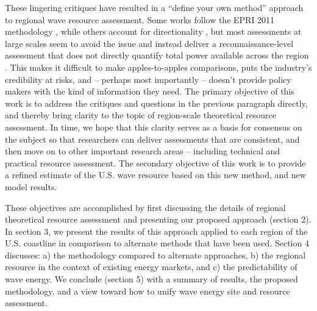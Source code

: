 These lingering critiques have resulted in a ``define your own method'' approach to regional wave resource assessment. Some works follow the EPRI 2011 methodology \citep[e.g., ]{kumarWaveEnergyResource2015}, while others account for directionality \citep[e.g., ]{gunnQuantifyingGlobalWave2012, regueroGlobalWavePower2015, hemerRevisedAssessmentAustralia2017}, but most assessments at large scales seem to avoid the issue and instead deliver a reconnaissance-level assessment that does not directly quantify total power available across the region \citep[e.g.,]{robertsonCharacterizingShoreWave2014, sierraWaveEnergyResource2013, zhengAssessingChinaSea2013, neillWavePowerVariability2013, alonsoWaveEnergyResource2015}.
This makes it difficult to make apples-to-apples comparisons, puts the industry's credibility at risks, and -- perhaps most importantly -- doesn't provide policy makers with the kind of information they need. The primary objective of this work is to address the critiques and questions in the previous paragraph directly, and thereby bring clarity to the topic of region-scale theoretical resource assessment. In time, we hope that this clarity serves as a basis for consensus on the subject so that researchers can deliver assessments that are consistent, and then move on to other important research areas -- including technical and practical resource assessment. The secondary objective of this work is to provide a refined estimate of
the U.S. wave resource based on this new method, and new model
results. 

These objectives are accomplished by first discussing the details of regional theoretical resource assessment and presenting our proposed approach (section 2). In section 3, we present the results of this approach applied to each region of the U.S. coastline in comparison to alternate methods that have been used. Section 4 discusses: a) the methodology compared to alternate approaches, b) the regional resource in the context of existing energy markets, and c) the predictability of wave energy. We conclude (section 5) with a summary of results, the proposed methodology, and a view toward how to unify wave energy site and resource assessment.